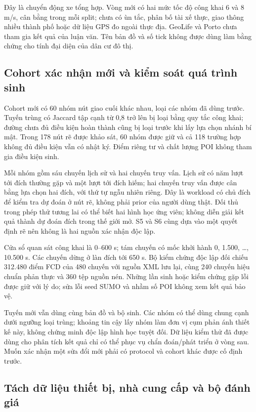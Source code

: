 Đây là chuyển động xe tổng hợp. Vòng mới có hai mức tốc độ công khai 6 và 8 m/s, cân bằng trong mỗi split; chưa có ùn tắc, phân bố tài xế thực, giao thông nhiều thành phố hoặc dữ liệu GPS đo ngoài thực địa. GeoLife và Porto chưa tham gia kết quả của luận văn. Tên bản đồ và số tick không được dùng làm bằng chứng cho tính đại diện của dân cư đô thị.

\subsection{Cohort xác nhận mới và kiểm soát quá trình sinh}

Cohort mới có 60 nhóm nút giao cuối khác nhau, loại các nhóm đã dùng trước. Tuyến trùng có Jaccard tập cạnh từ 0,8 trở lên bị loại bằng quy tắc công khai; đường chưa đủ điều kiện hoàn thành cũng bị loại trước khi lấy lựa chọn nhánh bí mật. Trong 178 nút rẽ được khảo sát, 60 nhóm được giữ và cả 118 trường hợp không đủ điều kiện vẫn có nhật ký. Điểm riêng tư và chất lượng POI không tham gia điều kiện sinh.

Mỗi nhóm gồm sáu chuyến lịch sử và hai chuyến truy vấn. Lịch sử có năm lượt tới đích thường gặp và một lượt tới đích hiếm; hai chuyến truy vấn được cân bằng lựa chọn hai đích, với thứ tự ngẫu nhiên riêng. Đây là workload có chủ đích để kiểm tra dự đoán ở nút rẽ, không phải prior của người dùng thật. Đối thủ trong phép thử tương lai có thể biết hai hình học ứng viên; không diễn giải kết quả thành dự đoán đích trong thế giới mở. S5 và S6 cùng dựa vào một quyết định rẽ nên không là hai nguồn xác nhận độc lập.

Cửa sổ quan sát công khai là 0--600 s; tám chuyến có mốc khởi hành 0, 1.500, \ldots, 10.500 s. Các chuyến dừng ở làn đích tới 650 s. Bộ kiểm chứng độc lập đối chiếu 312.480 điểm FCD của 480 chuyến với nguồn XML lưu lại, cùng 240 chuyến hiệu chuẩn phản thực và 360 tệp nguồn nén. Những lần sinh hoặc kiểm chứng gặp lỗi được giữ với lý do; sửa lỗi seed SUMO và nhầm số POI không xem kết quả bảo vệ.

Tuyến mới vẫn dùng cùng bản đồ và bộ sinh. Các nhóm có thể dùng chung cạnh dưới ngưỡng loại trùng; khoảng tin cậy lấy nhóm làm đơn vị cụm phản ánh thiết kế này, không chứng minh độc lập hình học tuyệt đối. Dữ liệu kiểm thử đã được dùng cho phân tích kết quả chỉ có thể phục vụ chẩn đoán/phát triển ở vòng sau. Muốn xác nhận một sửa đổi mới phải có protocol và cohort khác được cố định trước.

\subsection{Tách dữ liệu thiết bị, nhà cung cấp và bộ đánh giá}

